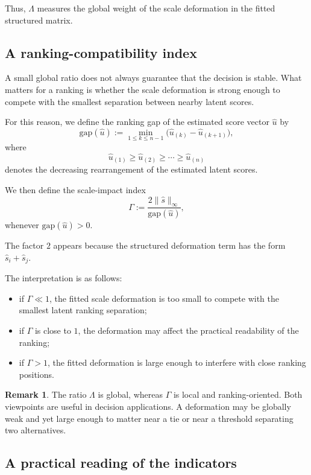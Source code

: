 \documentclass[11pt]{amsart}
\theoremstyle{definition}
\newtheorem{remark}[definition]{Remark}
\theoremstyle{plain}
\numberwithin{equation}{section}
\begin{document}
Thus, $\Lambda$ measures the global weight of the scale deformation in the fitted structured matrix.

\subsection{A ranking-compatibility index}

A small global ratio does not always guarantee that the decision is stable. What matters for a ranking is whether the scale deformation is strong enough to compete with the smallest separation between nearby latent scores.

For this reason, we define the ranking gap of the estimated score vector $\widehat u$ by
\[
\mathrm{gap}(\widehat u)
:=
\min_{1\leq k\leq n-1}
\bigl(\widehat u_{(k)}-\widehat u_{(k+1)}\bigr),
\]
where
\[
\widehat u_{(1)}\geq \widehat u_{(2)}\geq \cdots \geq \widehat u_{(n)}
\]
denotes the decreasing rearrangement of the estimated latent scores.

We then define the scale-impact index
\begin{equation}\label{eq:Gammacorr}
\Gamma
:=
\frac{2\|\widehat s\|_\infty}{\mathrm{gap}(\widehat u)},
\end{equation}
whenever $\mathrm{gap}(\widehat u)>0$.

The factor $2$ appears because the structured deformation term has the form $\widehat s_i+\widehat s_j$.

The interpretation is as follows:
\begin{itemize}
\item if $\Gamma\ll 1$, the fitted scale deformation is too small to compete with the smallest latent ranking separation;
\item if $\Gamma$ is close to $1$, the deformation may affect the practical readability of the ranking;
\item if $\Gamma>1$, the fitted deformation is large enough to interfere with close ranking positions.
\end{itemize}

\begin{remark}
The ratio $\Lambda$ is global, whereas $\Gamma$ is local and ranking-oriented. Both viewpoints are useful in decision applications. A deformation may be globally weak and yet large enough to matter near a tie or near a threshold separating two alternatives.
\end{remark}

\subsection{A practical reading of the indicators}
\end{document}
